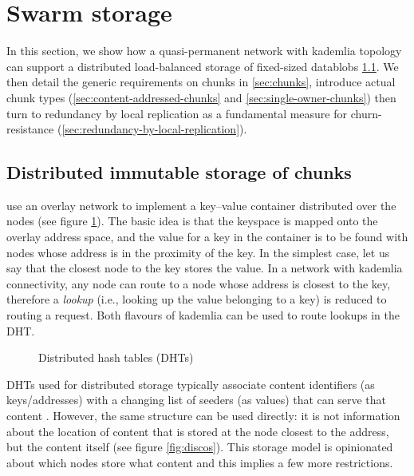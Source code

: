 \section{Swarm storage}\label{sec:kademlia-storage}

In this section, we show how a quasi-permanent network with kademlia topology can support a distributed load-balanced storage of fixed-sized datablobs \ref{sec:discos}.  We then detail the generic requirements on chunks in \ref{sec:chunks}, introduce actual  chunk types (\ref{sec:content-addressed-chunks} and \ref{sec:single-owner-chunks}) then turn to redundancy by local replication as a fundamental measure for churn-resistance (\ref{sec:redundancy-by-local-replication}).

\subsection{Distributed immutable storage of chunks}\label{sec:discos}
 
 use an overlay network to implement a key--value container distributed over the nodes (see  figure \ref{fig:DHT}). The basic idea is that the keyspace is mapped onto the overlay address space, and the value for a key in the container is to be found with nodes whose address is in the proximity of the key. In the simplest case, let us say that the closest node to the key stores the value. In a network with kademlia connectivity, any node can route to a node whose address is closest to the key, therefore a \emph{lookup} (i.e., looking up the value belonging to a key) is reduced to routing a request. Both flavours of kademlia can be used to route lookups in the DHT. 



\begin{figure}[htbp]
   \centering
   \caption{Distributed hash tables (DHTs)}
   \label{fig:DHT}
\end{figure}

DHTs used for distributed storage typically associate content identifiers (as keys/addresses) with a changing list of seeders (as values) that can serve that content \cite{ipfs2014, bittorrent}. However, the same structure can be used directly: it is not information about the location of content that is stored at the node closest to the address, but the content itself (see figure \ref{fig:discos}). This storage model is opinionated about which nodes store what content and this implies a few more restrictions. 

